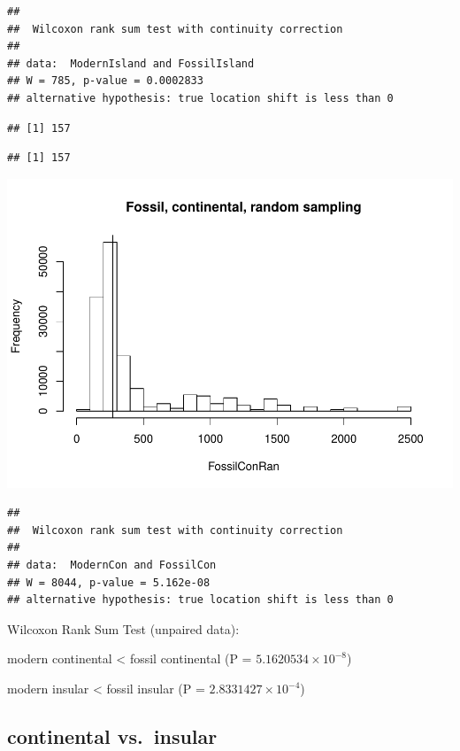 \documentclass[]{article}
\begin{document}
\begin{verbatim}
## 
##  Wilcoxon rank sum test with continuity correction
## 
## data:  ModernIsland and FossilIsland
## W = 785, p-value = 0.0002833
## alternative hypothesis: true location shift is less than 0
\end{verbatim}

\begin{verbatim}
## [1] 157
\end{verbatim}

\begin{verbatim}
## [1] 157
\end{verbatim}

\includegraphics{MA_JJ_files/figure-latex/RSMFCI-2.pdf}

\begin{verbatim}
## 
##  Wilcoxon rank sum test with continuity correction
## 
## data:  ModernCon and FossilCon
## W = 8044, p-value = 5.162e-08
## alternative hypothesis: true location shift is less than 0
\end{verbatim}

Wilcoxon Rank Sum Test (unpaired data):

modern continental \textless{} fossil continental (P =
\(5.1620534\times 10^{-8}\))

modern insular \textless{} fossil insular (P =
\(2.8331427\times 10^{-4}\))

\newpage

\subsection{continental vs.~insular}\label{continental-vs.insular-1}
\end{document}
